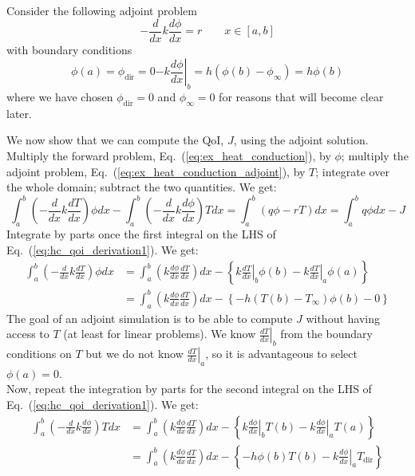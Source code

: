 \documentclass[11pt]{article}
\newcommand{\eqt}[1]{Eq.~(\ref{#1})}                     %
\newcommand{\be}{\begin{equation}}
\newcommand{\ee}{\end{equation}}
\begin{document}
Consider the following adjoint problem
\be
\label{eq:ex_heat_conduction_adjoint}
-\frac{d}{dx}k\frac{d\phi}{dx}=r \qquad x\in [a,b]
\ee
with boundary conditions
\begin{subequations}
\label{eq:ex_heat_conduction_bc_adjoint}
\be
\phi(a) = \phi_{\text{dir}} = 0 
\ee
\be
-k \left.\frac{d\phi}{dx}\right|_b = h(\phi(b)-\phi_{\infty}) = h\phi(b)
\ee
\end{subequations}
where we have chosen $\phi_{\text{dir}} = 0$ and $\phi_{\infty}=0$ for reasons that will become clear later.

We now show that we can compute the QoI, $J$, using the adjoint solution. Multiply the forward problem, \eqt{eq:ex_heat_conduction}, by $\phi$; multiply the adjoint problem, \eqt{eq:ex_heat_conduction_adjoint}, by $T$;  integrate over the whole domain; subtract the two quantities. We get:
\be
\label{eq:hc_qoi_derivation1}
\int_a^b \left( -\frac{d}{dx}k\frac{dT   }{dx} \right) \phi dx - 
\int_a^b \left( -\frac{d}{dx}k\frac{d\phi}{dx} \right) T    dx = \int_a^b ( q \phi - r T ) dx = \int_a^b q \phi dx - J
\ee
Integrate by parts once the first integral on the LHS of \eqt{eq:hc_qoi_derivation1}. We get:
\begin{align}
\label{eq:hc_qoi_derivation2}
\int_a^b \left( -\frac{d}{dx}k\frac{dT   }{dx} \right) \phi dx 
&= 
\int_a^b \left( k\frac{d\phi}{dx}\frac{dT}{dx} \right) dx 
- \left\{\left.k\frac{dT}{dx}\right|_b \phi(b) - 
         \left.k\frac{dT}{dx}\right|_a \phi(a) \right\} 
\nonumber \\
&= 
\int_a^b \left( k\frac{d\phi}{dx}\frac{dT}{dx} \right) dx 
- \left\{-h(T(b)-T_{\infty})\phi(b) - 0 \right\}
\end{align}
The goal of an adjoint simulation is to be able to compute $J$ without having access to $T$ (at least for linear problems). We know $\left.\frac{dT}{dx}\right|_b$ from the boundary conditions on $T$ but we do not know $\left.\frac{dT}{dx}\right|_a$, so it is advantageous to select $\phi(a)=0$.\\
Now, repeat the integration by parts for the second integral on the LHS of \eqt{eq:hc_qoi_derivation1}. We get:
\begin{align}
\label{eq:hc_qoi_derivation3}
\int_a^b \left( -\frac{d}{dx}k\frac{d\phi}{dx} \right) T    dx 
&= 
\int_a^b \left( k\frac{d\phi}{dx}\frac{dT}{dx} \right) dx 
- \left\{\left.k\frac{d\phi}{dx}\right|_b T(b) - 
         \left.k\frac{d\phi}{dx}\right|_a T(a) \right\} 
\nonumber \\
&= 
\int_a^b \left( k\frac{d\phi}{dx}\frac{dT}{dx} \right) dx 
- \left\{-h\phi(b)T(b) - \left.k\frac{d\phi}{dx}\right|_a T_{\text{dir}} \right\}
\end{align}
\end{document}
